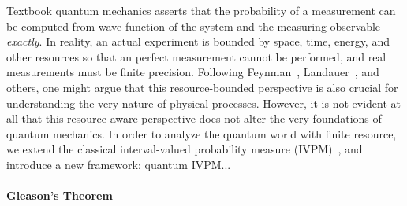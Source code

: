 \documentclass[english,reprint, aps, prl,superscriptaddress, showpacs,
showkeys, longbibliography]{revtex4-1}
\theoremstyle{plain}
\theoremstyle{definition}
\begin{document}
\maketitle

Textbook quantum mechanics asserts that the probability of a measurement
can be computed from wave function of the system and the measuring
observable \emph{exactly}. In reality, an actual experiment is bounded
by space, time, energy, and other resources so that an perfect measurement
cannot be performed, and real measurements must be finite precision.
Following Feynman~\cite{Feynman1982Simulating}, Landauer~\cite{Landauer1996188},
and others, one might argue that this resource-bounded perspective
is also crucial for understanding the very nature of physical processes.
However, it is not evident at all that this resource-aware perspective
does not alter the very foundations of quantum mechanics. In order
to analyze the quantum world with finite resource, we extend the classical
interval-valued probability measure (IVPM)~\cite{JamisonLodwick2004},
and introduce a new framework: quantum IVPM...\newpage{}

\paragraph{Gleason's Theorem}
\end{document}
